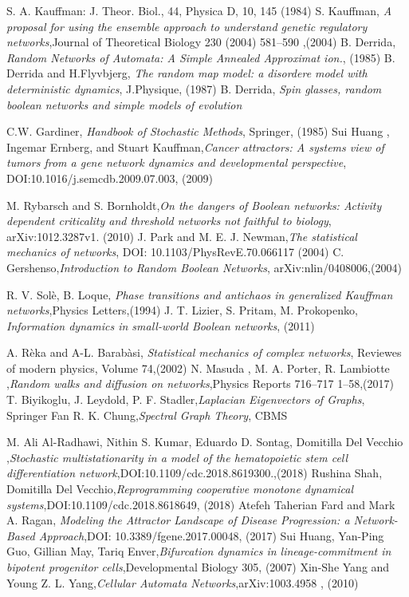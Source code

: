 \begin{thebibliography}{90}
 S. A. Kauffman: J. Theor. Biol., 44, Physica D, 10, 145 (1984)
 S. Kauffman, \emph{A proposal for using the ensemble approach to understand
genetic regulatory networks},Journal of Theoretical Biology 230 (2004) 581–590 ,(2004)
 B. Derrida, \emph{Random Networks of Automata: A Simple Annealed
Approximat ion.}, (1985)
 B. Derrida and H.Flyvbjerg, \emph{The random map model: a disordere model with deterministic dynamics}, J.Physique, (1987)
 B. Derrida, \emph{Spin glasses, random boolean networks and simple models of evolution}

 C.W. Gardiner, \emph{Handbook of Stochastic Methods}, Springer, (1985)
 Sui Huang , Ingemar Ernberg, and Stuart Kauffman,\emph{Cancer attractors: A systems view of tumors from a gene network
dynamics and developmental perspective}, DOI:10.1016/j.semcdb.2009.07.003, (2009)














 M. Rybarsch and S. Bornholdt,\emph{On the dangers of Boolean networks:
Activity dependent criticality and threshold networks not faithful to biology}, arXiv:1012.3287v1. (2010)
 J. Park and M. E. J. Newman,\emph{The statistical mechanics of networks}, DOI: 10.1103/PhysRevE.70.066117 (2004)
 C. Gershenso,\emph{Introduction to Random Boolean Networks}, arXiv:nlin/0408006,(2004)

 R. V. Solè, B. Loque, \emph{Phase transitions and antichaos in generalized Kauffman networks},Physics Letters,(1994)
 J. T. Lizier, S. Pritam, M. Prokopenko, \emph{Information dynamics in small-world Boolean networks}, (2011)

 A. Rèka and A-L. Barabàsi, \emph{Statistical mechanics of complex networks}, Reviewes of modern physics, Volume 74,(2002)
 N. Masuda , M. A. Porter, R. Lambiotte ,\emph{Random walks and diffusion on networks},Physics Reports 716–717 1–58,(2017)
 T. Biyikoglu, J. Leydold, P. F. Stadler,\emph{Laplacian Eigenvectors of Graphs}, Springer
 Fan R. K. Chung,\emph{Spectral Graph Theory}, CBMS

 M. Ali Al-Radhawi, Nithin S. Kumar, Eduardo D. Sontag, Domitilla Del Vecchio ,\emph{Stochastic multistationarity in a model of the hematopoietic
stem cell differentiation network},DOI:10.1109/cdc.2018.8619300.,(2018)
 Rushina Shah, Domitilla Del Vecchio,\emph{Reprogramming cooperative monotone dynamical systems},DOI:10.1109/cdc.2018.8618649, (2018)
 Atefeh Taherian Fard and Mark A. Ragan, \emph{Modeling the Attractor Landscape of
Disease Progression: a
Network-Based Approach},DOI: 10.3389/fgene.2017.00048, (2017)
 Sui Huang, Yan-Ping Guo, Gillian May, Tariq Enver,\emph{Bifurcation dynamics in lineage-commitment in bipotent progenitor cells},Developmental Biology 305, (2007)
 Xin-She Yang and Young Z. L. Yang,\emph{Cellular Automata Networks},arXiv:1003.4958 , (2010)


\end{thebibliography}

